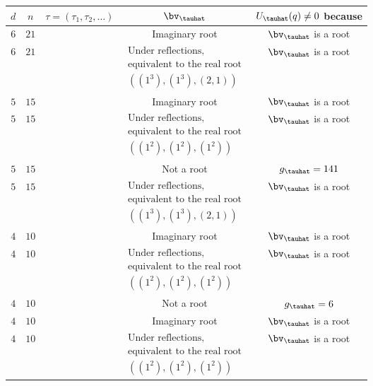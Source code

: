 \begin{figure}[H]
	\centering
	\begin{tabular}{|c|c|c|c|c|}
		\hline
		$d$& $n$ & $\tau=(\tau_1,\tau_2,\dots)$ & $\bv_\tauhat$ &$U_{\tauhat}(q)\neq 0$ because \\
		\hline\hline
		$6$&$21$ & \makecell{$\substack{    \tau_1 \leq  15\ \text{except}\ (15,6)}$} &
		Imaginary root & $\bv_\tauhat$ is a root \\
		\hline
		$6$&$21$ & \makecell{$\substack{ (15,6)}$} &
		$\substack{\text{Under reflections,}\\ \text{equivalent to the real root} \\ ((1^3),(1^3),(2,1)) }$ & $\bv_\tauhat$ is a root \\
		\hline\hline
		$5$&$15$ & \makecell{$\substack{   \tau_1 \leq  10 \\ \text{except}\ (9,6),(10,4,1),(10,5)}$} &
		Imaginary root &$\bv_\tauhat$ is a root \\
		\hline
		$5$&$15$ & \makecell{$\substack{  (10,4,1)}$} &
		$\substack{\text{Under reflections,}\\ \text{equivalent to the real root} \\ ((1^2),(1^2),(1^2)) }$ &$\bv_\tauhat$ is a root \\
		\hline
		$5$&$15$ & \makecell{$\substack{  (10,5)}$} &
		Not a root& $g_\tauhat=141$ \\
		\hline
		$5$&$15$ & \makecell{$\substack{ (9,6)}$} &
		$\substack{\text{Under reflections,}\\ \text{equivalent to the real root} \\ ((1^3),(1^3),(2,1)) }$&$\bv_\tauhat$ is a root \\
		\hline\hline
		$4$&$10$ & \makecell{$\substack{\tau_1\leq 5\  \text{except}\ (5,4,1),(5^2) }$} &
		Imaginary root &$\bv_\tauhat$ is a root  \\
		\hline
		$4$&$10$ & \makecell{$\substack{(5,4,1)}$} &
		$\substack{\text{Under reflections,}\\ \text{equivalent to the real root} \\ ((1^2),(1^2),(1^2)) }$ &$\bv_\tauhat$ is a root \\
		\hline
		$4$&$10$ & \makecell{$\substack{(5^2)}$} &
		Not a root &$g_\tauhat=6$\\
		\hline
		$4$&$10$ & \makecell{$\substack{(6,1^4)}$} &
		Imaginary root &$\bv_\tauhat$ is a root \\
		\hline
		$4$&$10$ & \makecell{$\substack{(6,2,1^2)}$} &
		$\substack{\text{Under reflections,}\\ \text{equivalent to the real root} \\ ((1^2),(1^2),(1^2)) }$ &$\bv_\tauhat$ is a root \\

\end{tabular}
\end{figure}
